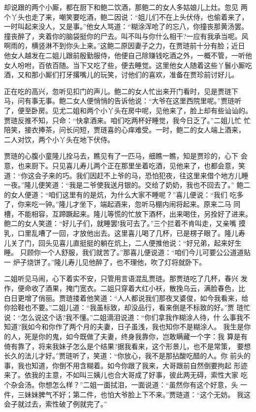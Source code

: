 却说跟的两个小厮，都在厨下和鲍二饮酒，那鲍二的女人多姑娘儿上灶。忽见
两个丫头也走了来，嘲笑要吃酒，鲍二因说：“姐儿们不在上头伏侍，也偷着来了，
一时叫起来没人，又是事。”他女人骂道：“糊涂浑呛了的忘八，你撞丧那黄汤罢。
撞丧醉了，夹着你的脑袋挺你的尸去。叫不叫与你什么相干?一应有我承当呢。风
啊雨的，横竖淋不到你头上来。”这鲍二原因妻子之力，在贾琏前十分有脸；近日
他女人越发在二姐儿跟前殷勤服侍，他便自己除赚钱吃酒之外，一概不管，一听他
女人吩咐，百依百随。当下又吃了些，便去睡觉。这里他女人随着这些丫鬟小厮吃
酒，又和那小厮们打牙撂嘴儿的玩笑，讨他们的喜欢，准备在贾珍前讨好儿。

正在吃的高兴，忽听见扣门的声儿。鲍二的女人忙出来开门看时，见是贾琏下
马，问有事无事。鲍二女人便悄悄的告诉他说：“大爷在这里西院里呢。”贾琏听
了，便至卧房。见尤二姐和两个小丫头在房中呢，见他来了，脸上却有些讪讪的。
贾琏反推不知，只命：“快拿酒来。咱们吃两杯好睡觉，我今日乏了。”二姐儿忙
忙陪笑，接衣捧茶，问长问短，贾琏喜的心痒难受。一时，鲍二的女人端上酒来，
二人对饮，两个小丫头在地下伏侍。

贾琏的心腹小童隆儿拴马去，瞧见有了一匹马，细瞧一瞧，知是贾珍的，心下
会意，也来厨下。只见喜儿寿儿两个正在那里坐着吃酒，见他来了，也都会意，笑
道：“你这会子来的巧。我们因赶不上爷的马，恐怕犯夜，往这里来借个地方儿睡
一夜。”隆儿便笑道：“我是二爷使我送月银的。交给了奶奶，我也不回去了。”
鲍二的女人便道：“咱们这里有的是炕，为什么大家不睡呢？”喜儿便说：“我们
吃多了，你来吃一钟。”隆儿才坐下，端起酒来，忽听马棚内闹将起来。原来二马
同槽，不能相容，互蹄蹶起来。隆儿等慌的忙放下酒杯，出来喝住，另拴好了进来。
鲍二的女人笑道：“好儿子们，就睡罢!我可去了。”三个拦着不肯叫走，又亲嘴
摸乳，口里乱嘈了一回，才放他出去。这里喜儿喝了几杯，已是楞子眼了。隆儿寿
儿关了门，回头见喜儿直挺挺的躺在炕上，二人便推他说：“好兄弟，起来好生睡。
只顾你一个人舒服，我们就苦了。”那喜儿便说道：“咱们今儿可要公公道道贴一
炉子烧饼了。”隆儿寿儿见他醉了，也不理他，吹了灯将就卧下。

二姐听见马闹，心下着实不安，只管用言语混乱贾琏。那贾琏吃了几杯，春兴
发作，便命收了酒果，掩门宽衣。二姐只穿着大红小袄，散挽乌云，满脸春色，比
白日更增了俏丽。贾琏搂着他笑道：“人人都说我们那夜叉婆俊，如今我看来，给
你拾鞋也不要。”二姐儿道：“我虽标致，却没品行，看来倒是不标致的好。”贾
琏忙说：“怎么说这个话?我不懂。”二姐滴泪说道：“你们拿我作糊涂人待，什
么事我不知道?我如今和你作了两个月的夫妻，日子虽浅，我也知你不是糊涂人。
我生是你的人，死是你的鬼，如今既做了夫妻，终身我靠你，岂敢瞒藏一个字：我
算是有倚有靠了，将来我妹子怎么是个结果?据我看来，这个形景儿，也不是常策，
要想长久的法儿才好。”贾琏听了，笑道：“你放心，我不是那拈酸吃醋的人。你
前头的事，我也知道，你倒不用含糊着。如今你跟了我来，大哥跟前自然倒要拘起
形迹来了。依我的主意，不如叫三姨儿也合大哥成了好事，彼此两无碍，索性大家
吃个杂会汤。你想怎么样？”二姐一面拭泪，一面说道：“虽然你有这个好意，头
一件，三妹妹脾气不好；第二件，也怕大爷脸上下不来。”贾琏道：“这个无妨。
我这会子就过去，索性破了例就完了。”

